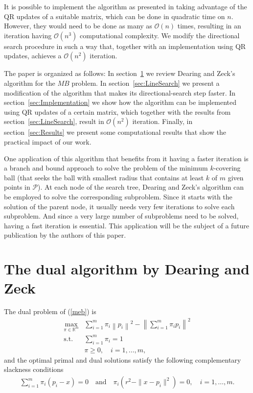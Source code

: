 It is possible to implement the algorithm as presented in \cite{Dearing09} taking advantage of the QR updates of a suitable matrix, which can be done in quadratic time on $n$. However, they would need to be done as many as ${\mathcal{O}}(n)$ times, resulting in an iteration having ${\mathcal{O}}(n^3)$ computational complexity. We modify the directional search procedure in such a way that, together with an implementation using QR updates, achieves a ${\mathcal{O}}(n^2)$ iteration.

\smallskip

The paper is organized as follows: In section~\ref{sec:DearingZeck} we review Dearing and Zeck's algorithm for the $MB$ problem. In section~\ref{sec:LineSearch} we present a modification of the algorithm that makes its directional-search step faster. In section~\ref{sec:Implementation} we show how the algorithm can be implemented using QR updates of a certain matrix, which together with the results from section~\ref{sec:LineSearch}, result in ${\mathcal{O}}(n^2)$ iteration. Finally, in section~\ref{sec:Results} we present some computational results that show the practical impact of our work.

\smallskip

One application of this algorithm that benefits from it having a faster iteration is a branch and bound approach to solve the problem of the minimum $k$-covering ball (that seeks the ball with smallest radius that contains at least $k$ of $m$ given points in ${\mathcal{P}}$). At each node of the search tree, Dearing and Zeck's algorithm can be employed to solve the corresponding subproblem. Since it starts with the solution of the parent node, it usually needs very few iterations to solve each subproblem. And since a very large number of subproblems need to be solved, having a fast iteration is essential. This application will be the subject of a future publication by the authors of this paper.

\section{The dual algorithm by Dearing and Zeck}\label{sec:DearingZeck}

The dual problem of (\ref{meb}) is
\begin{equation} \begin{array}{cl}\label{dual}
\displaystyle\max_{\pi\in {\mathbb{R}}^m} & \displaystyle\sum_{i=1}^{m} \pi_i\left\|p_i\right\|^2 - \left\|\sum_{i=1}^{m} \pi_i p_i\right\| ^2\\
\text{s.t.} & \displaystyle\sum_{i=1}^{m} \pi_i =1\\
& \pi\geq 0,\quad i=1,\dots, m,
\end{array}\end{equation}
\noindent and the optimal primal and dual solutions satisfy the following complementary slackness conditions
\begin{equation} \begin{array}{rl}\label{c}
\displaystyle \sum_{i=1}^{m}\pi_i \left(p_i -x\right)=0\quad \text{and}\quad \pi_i\left(r^2 - \|x-p_i\|^2\right) = 0,\quad i=1,\dots,m.
\end{array}\end{equation}

